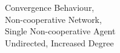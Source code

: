 \documentclass[a4paper, 12pt]{report}
\begin{document}
\begin{figure}[!htbp]
\begin{minipage}{.45\linewidth}
    \end{minipage}\par\medskip
    \centering
    
    \caption{Convergence Behaviour, \\ Non-cooperative Network, \\ Single Non-cooperative Agent \\ Undirected, Increased Degree}
\end{figure}
\end{document}
